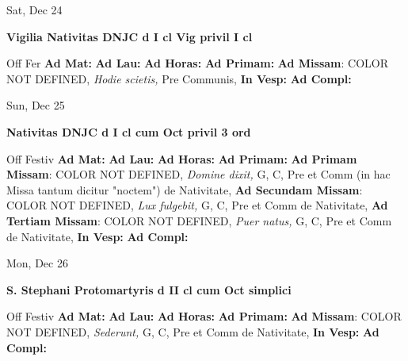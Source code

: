 \documentclass[10pt]{book}
\begin{document}
\begin{center}
\begin{minipage}{3.5in}
\vspace{2em}
\begin{center}Sat, Dec 24
\end{center}
\textbf{ \large Vigilia Nativitas DNJC
\textnormal{\normalsize d I cl Vig privil I cl}}

\begin{justify}Off Fer
\textbf{Ad Mat: }
\textbf{Ad Lau: }
\textbf{Ad Horas: }
\textbf{Ad Primam: }\textbf{Ad Missam}: COLOR NOT DEFINED, \textit{Hodie scietis,} Pre Communis, 
\textbf{In Vesp: }
\textbf{Ad Compl: }
\end{justify}
\end{minipage}
\end{center}

\begin{center}
\begin{minipage}{3.5in}
\vspace{2em}
\begin{center}Sun, Dec 25
\end{center}
\textbf{ \large Nativitas DNJC
\textnormal{\normalsize d I cl cum Oct privil 3 ord}}

\begin{justify}Off Festiv
\textbf{Ad Mat: }
\textbf{Ad Lau: }
\textbf{Ad Horas: }
\textbf{Ad Primam: }\textbf{Ad Primam Missam}: COLOR NOT DEFINED, \textit{Domine dixit,} G, C, Pre et Comm (in hac Missa tantum dicitur "noctem") de Nativitate, \textbf{Ad Secundam Missam}: COLOR NOT DEFINED, \textit{Lux fulgebit,} G, C, Pre et Comm de Nativitate, \textbf{Ad Tertiam Missam}: COLOR NOT DEFINED, \textit{Puer natus,} G, C, Pre et Comm de Nativitate, 
\textbf{In Vesp: }
\textbf{Ad Compl: }
\end{justify}
\end{minipage}
\end{center}

\begin{center}
\begin{minipage}{3.5in}
\vspace{2em}
\begin{center}Mon, Dec 26
\end{center}
\textbf{ \large S. Stephani Protomartyris
\textnormal{\normalsize d II cl cum Oct simplici}}

\begin{justify}Off Festiv
\textbf{Ad Mat: }
\textbf{Ad Lau: }
\textbf{Ad Horas: }
\textbf{Ad Primam: }\textbf{Ad Missam}: COLOR NOT DEFINED, \textit{Sederunt,} G, C, Pre et Comm de Nativitate, 
\textbf{In Vesp: }
\textbf{Ad Compl: }
\end{justify}
\end{minipage}
\end{center}
\end{document}
